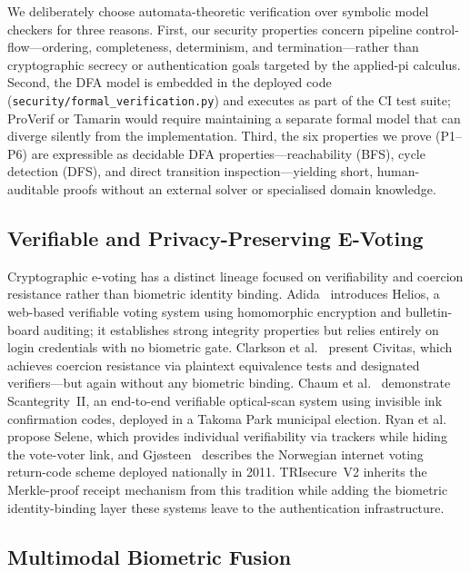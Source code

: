 \documentclass[pdflatex,sn-mathphys-num]{sn-jnl}%
\theoremstyle{thmstyleone}%
\theoremstyle{thmstyletwo}%
\theoremstyle{thmstylethree}%
\begin{document}
We deliberately choose automata-theoretic verification over symbolic model
checkers for three reasons. First, our security properties concern pipeline
control-flow—ordering, completeness, determinism, and termination—rather than
cryptographic secrecy or authentication goals targeted by the applied-pi
calculus. Second, the DFA model is embedded in the deployed code
(\texttt{security/formal\_verification.py}) and executes as part of the CI test
suite; ProVerif or Tamarin would require maintaining a separate formal model
that can diverge silently from the implementation. Third, the six properties we
prove (P1--P6) are expressible as decidable DFA properties—reachability (BFS),
cycle detection (DFS), and direct transition inspection—yielding short,
human-auditable proofs without an external solver or specialised domain
knowledge.

\subsection{Verifiable and Privacy-Preserving E-Voting}

Cryptographic e-voting has a distinct lineage focused on verifiability and
coercion resistance rather than biometric identity binding. Adida~\cite{adida2008helios}
introduces Helios, a web-based verifiable voting system using homomorphic
encryption and bulletin-board auditing; it establishes strong integrity
properties but relies entirely on login credentials with no biometric gate.
Clarkson et al.~\cite{clarkson2008civitas} present Civitas, which achieves
coercion resistance via plaintext equivalence tests and designated
verifiers—but again without any biometric binding. Chaum et
al.~\cite{chaum2009scantegrity} demonstrate Scantegrity~II, an end-to-end
verifiable optical-scan system using invisible ink confirmation codes, deployed
in a Takoma Park municipal election. Ryan et al.~\cite{ryan2016selene} propose
Selene, which provides individual verifiability via trackers while hiding the
vote-voter link, and Gj{\o}steen~\cite{gjosteen2010norwegian} describes the
Norwegian internet voting return-code scheme deployed nationally in 2011.
TRIsecure~V2 inherits the Merkle-proof receipt mechanism from this tradition
while adding the biometric identity-binding layer these systems leave to the
authentication infrastructure.

\subsection{Multimodal Biometric Fusion}
\end{document}
